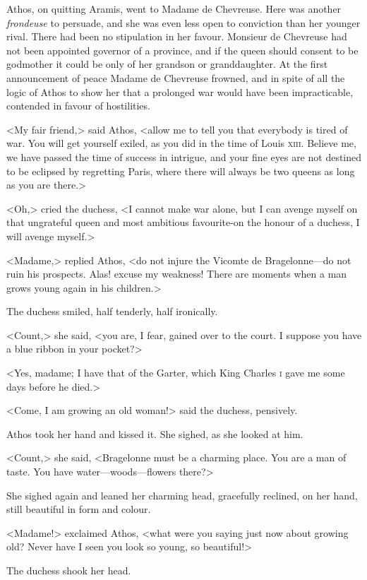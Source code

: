 Athos, on quitting Aramis, went to Madame de Chevreuse. Here was another \textit{frondeuse} to persuade, and she was even less open to conviction than her younger rival. There had been no stipulation in her favour. Monsieur de Chevreuse had not been appointed governor of a province, and if the queen should consent to be godmother it could be only of her grandson or granddaughter. At the first announcement of peace Madame de Chevreuse frowned, and in spite of all the logic of Athos to show her that a prolonged war would have been impracticable, contended in favour of hostilities.

<My fair friend,> said Athos, <allow me to tell you that everybody is tired of war. You will get yourself exiled, as you did in the time of Louis \textsc{xiii}. Believe me, we have passed the time of success in intrigue, and your fine eyes are not destined to be eclipsed by regretting Paris, where there will always be two queens as long as you are there.>

<Oh,> cried the duchess, <I cannot make war alone, but I can avenge myself on that ungrateful queen and most ambitious favourite-on the honour of a duchess, I will avenge myself.>

<Madame,> replied Athos, <do not injure the Vicomte de Bragelonne—do not ruin his prospects. Alas! excuse my weakness! There are moments when a man grows young again in his children.>

The duchess smiled, half tenderly, half ironically.

<Count,> she said, <you are, I fear, gained over to the court. I suppose you have a blue ribbon in your pocket?>

<Yes, madame; I have that of the Garter, which King Charles \textsc{i}  gave me some days before he died.>

<Come, I am growing an old woman!> said the duchess, pensively.

Athos took her hand and kissed it. She sighed, as she looked at him.

<Count,> she said, <Bragelonne must be a charming place. You are a man of taste. You have water—woods—flowers there?>

She sighed again and leaned her charming head, gracefully reclined, on her hand, still beautiful in form and colour.

<Madame!> exclaimed Athos, <what were you saying just now about growing old? Never have I seen you look so young, so beautiful!>

The duchess shook her head.

